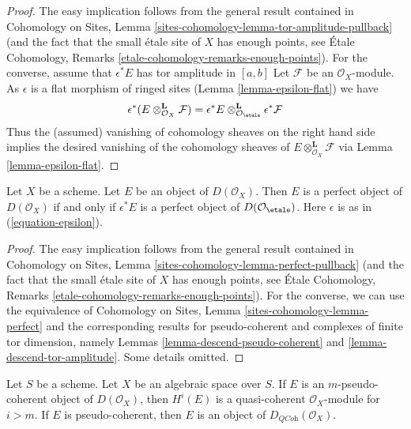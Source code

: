 \begin{proof}
The easy implication follows from the general result contained in
Cohomology on Sites, Lemma \ref{sites-cohomology-lemma-tor-amplitude-pullback}
(and the fact that the small \'etale site of $X$ has enough points, see
\'Etale Cohomology, Remarks \ref{etale-cohomology-remarks-enough-points}).
For the converse, assume that $\epsilon^*E$ has tor amplitude in $[a, b]$
Let $\mathcal{F}$ be an $\mathcal{O}_X$-module. As $\epsilon$ is a flat
morphism of ringed sites (Lemma \ref{lemma-epsilon-flat})
we have
$$
\epsilon^*(E \otimes^\mathbf{L}_{\mathcal{O}_X} \mathcal{F})
=
\epsilon^*E
\otimes^\mathbf{L}_{\mathcal{O}_\etale}
\epsilon^*\mathcal{F}
$$
Thus the (assumed) vanishing of cohomology sheaves on the right hand side
implies the desired vanishing of the cohomology sheaves of
$E \otimes^\mathbf{L}_{\mathcal{O}_X} \mathcal{F}$ via
Lemma \ref{lemma-epsilon-flat}.
\end{proof}

\begin{lemma}
\label{lemma-descend-perfect}
Let $X$ be a scheme. Let $E$ be an object of $D(\mathcal{O}_X)$.
Then $E$ is a perfect object of $D(\mathcal{O}_X)$ if and only if
$\epsilon^*E$ is a perfect object of $D(\mathcal{O}_\etale)$.
Here $\epsilon$ is as in (\ref{equation-epsilon}).
\end{lemma}

\begin{proof}
The easy implication follows from the general result contained in
Cohomology on Sites, Lemma \ref{sites-cohomology-lemma-perfect-pullback}
(and the fact that the small \'etale site of $X$ has enough points, see
\'Etale Cohomology, Remarks \ref{etale-cohomology-remarks-enough-points}).
For the converse, we can use the equivalence of
Cohomology on Sites, Lemma \ref{sites-cohomology-lemma-perfect}
and the corresponding results for pseudo-coherent and complexes of
finite tor dimension, namely
Lemmas \ref{lemma-descend-pseudo-coherent} and
\ref{lemma-descend-tor-amplitude}.
Some details omitted.
\end{proof}

\begin{lemma}
\label{lemma-pseudo-coherent}
Let $S$ be a scheme. Let $X$ be an algebraic space over $S$.
If $E$ is an $m$-pseudo-coherent object of $D(\mathcal{O}_X)$,
then $H^i(E)$ is a quasi-coherent $\mathcal{O}_X$-module for $i > m$.
If $E$ is pseudo-coherent, then $E$ is an object of
$D_{\textit{QCoh}}(\mathcal{O}_X)$.
\end{lemma}

